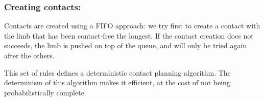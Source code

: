 
\subsubsection{Creating contacts:}
Contacts are created using a FIFO approach: we try first to create a contact with the limb that has been contact-free the longest. If the contact creation does not succeeds, the limb is pushed on top of the queue, and will only be tried again after the others.

This set of rules defines a deterministic contact planning algorithm.
The determinism of this algorithm makes it efficient, at the cost of not being probabilistically complete.

